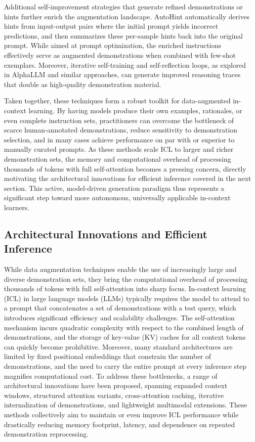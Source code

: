 \documentclass[11pt]{article}
\begin{document}
Additional self-improvement strategies that generate refined demonstrations or hints further enrich the augmentation landscape. AutoHint \cite{ref103} automatically derives hints from input-output pairs where the initial prompt yields incorrect predictions, and then summarizes these per-sample hints back into the original prompt. While aimed at prompt optimization, the enriched instructions effectively serve as augmented demonstrations when combined with few-shot exemplars. Moreover, iterative self-training and self-reflection loops, as explored in AlphaLLM \cite{ref104} and similar approaches, can generate improved reasoning traces that double as high-quality demonstration material.

Taken together, these techniques form a robust toolkit for data-augmented in-context learning. By having models produce their own examples, rationales, or even complete instruction sets, practitioners can overcome the bottleneck of scarce human-annotated demonstrations, reduce sensitivity to demonstration selection, and in many cases achieve performance on par with or superior to manually curated prompts. As these methods scale ICL to larger and richer demonstration sets, the memory and computational overhead of processing thousands of tokens with full self-attention becomes a pressing concern, directly motivating the architectural innovations for efficient inference covered in the next section. This active, model-driven generation paradigm thus represents a significant step toward more autonomous, universally applicable in-context learners.

\subsection{Architectural Innovations and Efficient Inference}

While data augmentation techniques enable the use of increasingly large and diverse demonstration sets, they bring the computational overhead of processing thousands of tokens with full self-attention into sharp focus. In-context learning (ICL) in large language models (LLMs) typically requires the model to attend to a prompt that concatenates a set of demonstrations with a test query, which introduces significant efficiency and scalability challenges. The self-attention mechanism incurs quadratic complexity with respect to the combined length of demonstrations, and the storage of key-value (KV) caches for all context tokens can quickly become prohibitive. Moreover, many standard architectures are limited by fixed positional embeddings that constrain the number of demonstrations, and the need to carry the entire prompt at every inference step magnifies computational cost. To address these bottlenecks, a range of architectural innovations have been proposed, spanning expanded context windows, structured attention variants, cross-attention caching, iterative internalization of demonstrations, and lightweight multimodal extensions. These methods collectively aim to maintain or even improve ICL performance while drastically reducing memory footprint, latency, and dependence on repeated demonstration reprocessing.
\end{document}
